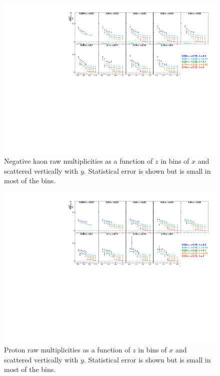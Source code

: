 \begin{figure}[!h]
  \includegraphics[scale=0.85]{./gfx/rawkm.pdf}
  \caption{Negative kaon raw multiplicities as a function of $z$ in bins of $x$ and scattered vertically with $y$. Statistical error is shown but is small in most of the bins.}
  \label{pic:rawkm}
\end{figure}

\begin{figure}[!h]
  \includegraphics[scale=0.85]{./gfx/rawpp.pdf}
  \caption{Proton raw multiplicities as a function of $z$ in bins of $x$ and scattered vertically with $y$. Statistical error is shown but is small in most of the bins.}
  \label{pic:rawpp}
\end{figure}

